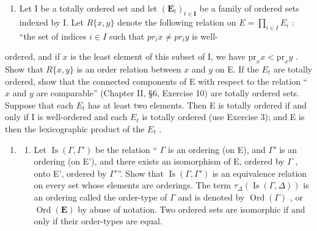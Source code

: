 \begin{enumerate}
\def\labelenumi{\arabic{enumi}.}
\setcounter{enumi}{11}
\tightlist
\item
  Let I be a totally ordered set and let \((\mathbf{E}_{t})_{t\in\mathbf{I}}\) be a family of ordered sets indexed by I. Let \(R\{x,y\}\) denote the following relation on \(E=\prod_{i\in I}E_{i}\) : ``the set of indices \(i\in I\) such that \(pr_{i}x\neq pr_{i}y\) is well-
\end{enumerate}

ordered, and if \(x\) is the least element of this subset of I, we have \(\mathrm{pr}_x x < \mathrm{pr}_x y\) . Show that \(R\{x, y\}\) is an order relation between \(x\) and \(y\) on E. If the \(E_t\) are totally ordered, show that the connected components of E with respect to the relation `` \(x\) and \(y\) are comparable'' (Chapter II, §6, Exercise 10) are totally ordered sets. Suppose that each \(E_t\) has at least two elements. Then E is totally ordered if and only if I is well-ordered and each \(E_t\) is totally ordered (use Exercise 3); and E is then the lexicographic product of the \(E_t\) .

\begin{enumerate}
\def\labelenumi{\arabic{enumi}.}
\setcounter{enumi}{12}
\tightlist
\item
  \begin{enumerate}
  \def\labelenumii{(\alph{enumii})}
  \tightlist
  \item
    Let \(\operatorname{Is}(\Gamma, \Gamma')\) be the relation `` \(\Gamma\) is an ordering (on E), and \(\Gamma'\) is an ordering (on E'), and there exists an isomorphism of E, ordered by \(\Gamma\) , onto E', ordered by \(\Gamma'\)''. Show that \(\operatorname{Is}(\Gamma, \Gamma')\) is an equivalence relation on every set whose elements are orderings. The term \(\tau_{\Delta}(\operatorname{Is}(\Gamma, \Delta))\) is an ordering called the order-type of \(\Gamma\) and is denoted by \(\operatorname{Ord}(\Gamma)\) , or \(\operatorname{Ord}(\mathbf{E})\) by abuse of notation. Two ordered sets are isomorphic if and only if their order-types are equal.
  \end{enumerate}
\end{enumerate}

